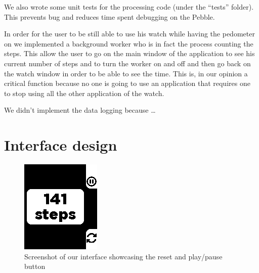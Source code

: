 \documentclass[12pt,twoside,a4paper]{article}
\begin{document}
We also wrote some unit tests for the processing code (under the ``tests'' folder).
This prevents bug and reduces time spent debugging on the Pebble.

In order for the user to be still able to use his watch while having the pedometer on we implemented a background worker who is in fact the process counting the steps. This allow the user to go on the main window of the application to see his current number of steps and to turn the worker on and off and then go back on the watch window in order to be able to see the time. This is, in our opinion a critical function because no one is going to use an application that requires one to stop using all the other application of the watch.

We didn't implement the data logging because \ldots

\section{Interface design}
\begin{figure}[h]
    \centering
    \includegraphics{screenshot}
    \caption{Screenshot of our interface showcasing the reset and play/pause button}
    \label{fig:interface}
\end{figure}
\end{document}

